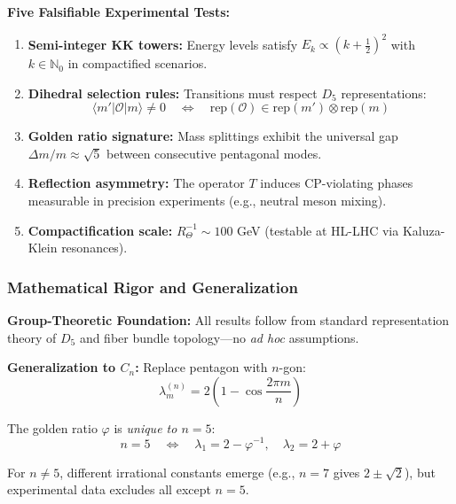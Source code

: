 \documentclass[12pt]{article}
\begin{document}
\textbf{Five Falsifiable Experimental Tests:}

\begin{enumerate}
\item \textbf{Semi-integer KK towers:} Energy levels satisfy $E_k \propto (k + \frac{1}{2})^2$ with $k \in \mathbb{N}_0$ in compactified scenarios.

\item \textbf{Dihedral selection rules:} Transitions must respect $D_5$ representations:
\begin{equation}
\langle m' | \mathcal{O} | m \rangle \neq 0 \quad \Leftrightarrow \quad \text{rep}(\mathcal{O}) \in \text{rep}(m') \otimes \text{rep}(m)
\end{equation}

\item \textbf{Golden ratio signature:} Mass splittings exhibit the universal gap $\Delta m / m \approx \sqrt{5}$ between consecutive pentagonal modes.

\item \textbf{Reflection asymmetry:} The operator $T$ induces CP-violating phases measurable in precision experiments (e.g., neutral meson mixing).

\item \textbf{Compactification scale:} $R_\Theta^{-1} \sim 100$ GeV (testable at HL-LHC via Kaluza-Klein resonances).
\end{enumerate}

\subsubsection{Mathematical Rigor and Generalization}

\textbf{Group-Theoretic Foundation:} All results follow from standard representation theory of $D_5$ and fiber bundle topology—no \textit{ad hoc} assumptions.

\textbf{Generalization to $C_n$:} Replace pentagon with $n$-gon:
\begin{equation}
\lambda_m^{(n)} = 2\left(1 - \cos\frac{2\pi m}{n}\right)
\end{equation}

The golden ratio $\varphi$ is \textit{unique to $n=5$}:
\begin{equation}
n = 5 \quad \Leftrightarrow \quad \lambda_1 = 2 - \varphi^{-1}, \quad \lambda_2 = 2 + \varphi
\end{equation}

For $n \neq 5$, different irrational constants emerge (e.g., $n=7$ gives $2 \pm \sqrt{2}$), but experimental data excludes all except $n=5$.
\end{document}
